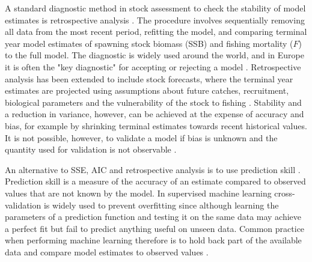 \documentclass[12pt,halfline,a4paper,nonumbib]{ouparticle}
\begin{document}
A standard diagnostic method in stock assessment to check the stability of model estimates is retrospective analysis \parencite{hurtado2014looking}. The procedure involves sequentially removing all data from the most recent period, refitting the model, and comparing terminal year model estimates of spawning stock biomass (SSB) and fishing mortality ($F$) to the full model. The diagnostic is widely used around the world, and in Europe it is often the "key diagnostic" for accepting or rejecting a model \parencite{GFCM2020, ICES2019}. Retrospective analysis has been extended to include stock forecasts, where the terminal year estimates are projected using assumptions about future catches, recruitment, biological parameters and the vulnerability of the stock to fishing \parencite[e.g.][]{brooks2016retrospective}. Stability and a reduction in variance, however, can be achieved at the expense of accuracy and bias, for example by shrinking terminal estimates towards recent historical values. It is not possible, however, to validate a model if bias is unknown and the quantity used for validation is not observable \parencite{hodges1992you}. 

An alternative to SSE, AIC and retrospective analysis is to use  prediction skill \parencite{glickman2000glossary}. Prediction skill is a measure of the accuracy of an estimate compared to observed values that are not known by the model. In supervised machine learning cross-validation is widely used to prevent overfitting since although learning the parameters of a prediction function and testing it on the same data may achieve a perfect fit but fail to predict anything useful on unseen data. Common practice when performing machine learning therefore is to hold back part of the available data and compare model estimates to observed values \parencite{jin2008current, weigel2008can, balmaseda1995decadal}. 
\end{document}

